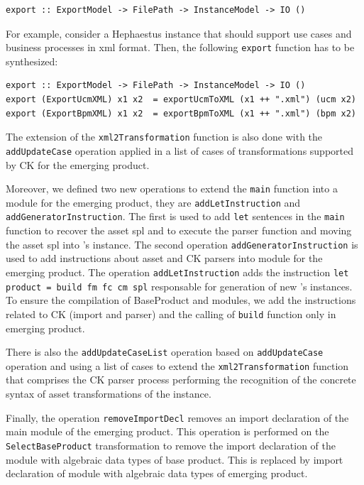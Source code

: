 \begin{lstlisting}
export :: ExportModel -> FilePath -> InstanceModel -> IO ()
\end{lstlisting}

For example, consider a Hephaestus instance that should support use cases and business processes in xml format. Then, the following \texttt{export} function has to be synthesized:

\begin{lstlisting}
export :: ExportModel -> FilePath -> InstanceModel -> IO ()
export (ExportUcmXML) x1 x2  = exportUcmToXML (x1 ++ ".xml") (ucm x2)
export (ExportBpmXML) x1 x2  = exportBpmToXML (x1 ++ ".xml") (bpm x2)
\end{lstlisting}

The extension of the \texttt{xml2Transformation} function is also done with the \texttt{addUpdateCase} operation applied in a list of cases of transformations supported by CK for the emerging \hpl{} product.


Moreover, we defined two new operations to extend the \texttt{main} function into a module for the emerging product, they are \texttt{addLetInstruction} and \texttt{addGeneratorInstruction}. The first is used to add  \texttt{let} sentences in the \texttt{main} function to recover the asset spl and to execute the parser function and moving the asset spl into \hpl's instance. The second operation \texttt{addGeneratorInstruction} is used to add instructions about asset and CK parsers into module for the emerging product.
The operation \texttt{addLetInstruction} adds the instruction \texttt{let product = build fm fc cm spl} responsable for generation of new \hpl's instances. To ensure the compilation of BaseProduct and \hpl{} modules, we add the instructions related to CK (import and parser) and the calling of \texttt{build} function only in emerging product.

There is also the \texttt{addUpdateCaseList} operation based on \texttt{addUpdateCase} operation and using a list of cases to extend the \texttt{xml2Transformation} function that comprises the CK parser process performing the recognition of the concrete syntax of asset transformations of the \hpl{} instance.

Finally, the operation \texttt{removeImportDecl} removes an import declaration of the main module of the emerging product. This operation is performed on the \texttt{SelectBaseProduct} transformation to remove the import declaration of the module with algebraic data types of base product. This is replaced by import declaration of module with algebraic data types of emerging \hpl{} product.

